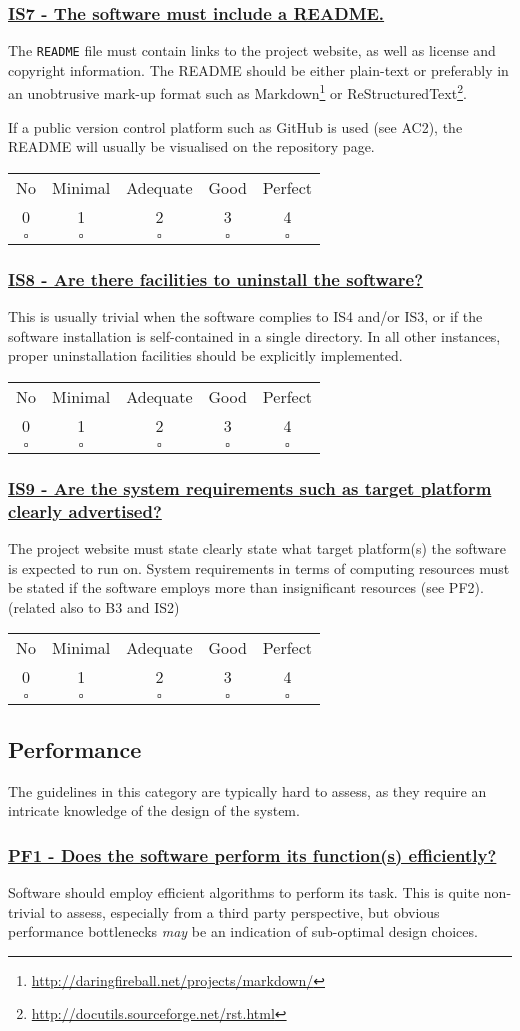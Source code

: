 \documentclass[a4paper,11pt]{article}
\newcommand{\criterion}[2]{\subsubsection*{\underline{#1 - #2}}\label{id:#1}}
\newcommand\CheckTable{%
  \begin{tabular}{ccccc}
    No & Minimal & Adequate & Good & Perfect \\
    0 & 1 & 2 & 3 & 4 \\
    \hline
    $\square$ & $\square$ & $\square$ & $\square$ & $\square$ \\
  \end{tabular}%
}
\begin{document}
\newcommand{\isSevenID}{IS7}
\newcommand{\isSevenText}{The software must include a README.}
\criterion{\isSevenID}{\isSevenText}

The \texttt{README} file must contain links to the project website, as well as
license and copyright information. The README should be either plain-text or
preferably in an unobtrusive mark-up format such as
Markdown\footnote{\url{http://daringfireball.net/projects/markdown/}} or
ReStructuredText\footnote{\url{http://docutils.sourceforge.net/rst.html}}.

If a public version control platform such as GitHub is used (see AC2), the
README will usually be visualised on the repository page.

\CheckTable

\newcommand{\isEightID}{IS8}
\newcommand{\isEightText}{Are there facilities to uninstall the software?}
\criterion{\isEightID}{\isEightText}

This is usually trivial when the software complies to IS4 and/or IS3, or if the
software installation is self-contained in a single directory. In all other
instances, proper uninstallation facilities should be explicitly implemented.

\CheckTable

\newcommand{\isNineID}{IS9}
\newcommand{\isNineText}{Are the system requirements such as target platform clearly advertised?}
\criterion{\isNineID}{\isNineText}

The project website must state clearly state what target platform(s) the software is expected to run on.
System requirements in terms of computing resources must be stated if the software employs more than insignificant resources (see PF2).
(related also to B3 and IS2)

\CheckTable

\subsection{Performance}\label{sec:per}

The guidelines in this category are typically hard to assess, as they require
an intricate knowledge of the design of the system. 

\newcommand{\pfOneID}{PF1}
\newcommand{\pfOneText}{Does the software perform its function(s) efficiently?}
\criterion{\pfOneID}{\pfOneText}

Software should employ efficient algorithms to perform its task. This is quite
non-trivial to assess, especially from a third party perspective, but obvious
performance bottlenecks \emph{may} be an indication of sub-optimal design
choices.
\end{document}
